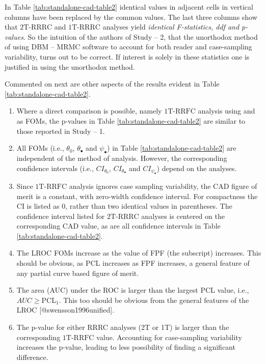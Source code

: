 \documentclass[
]{article}
\providecommand{\tightlist}{%
  \setlength{\itemsep}{0pt}\setlength{\parskip}{0pt}}
\begin{document}
In Table \ref{tab:standalone-cad-table2} identical values in adjacent cells in vertical columns have been replaced by the common values. The last three columns show that \(\text{2T-RRRC}\) and \(\text{1T-RRRC}\) analyses yield \emph{identical F-statistics, ddf and p-values}. So the intuition of the authors of Study -- 2, that the unorthodox method of using DBM -- MRMC software to account for both reader and case-sampling variability, turns out to be correct. If interest is solely in these statistics one is justified in using the unorthodox method.

Commented on next are other aspects of the results evident in Table \ref{tab:standalone-cad-table2}.

\begin{enumerate}
\def\labelenumi{\arabic{enumi}.}
\tightlist
\item
  Where a direct comparison is possible, namely \(\text{1T-RRFC}\) analysis using and as FOMs, the p-values in Table \ref{tab:standalone-cad-table2} are similar to those reported in Study -- 1.
\item
  All FOMs (i.e., \(\theta_0\), \(\theta_{\bullet}\) and \(\psi_{\bullet}\)) in Table \ref{tab:standalone-cad-table2} are independent of the method of analysis. However, the corresponding confidence intervals (i.e., \(CI_{\theta_0}\), \(CI_{\theta_{\bullet}}\) and \(CI_{\psi_{\bullet}}\)) depend on the analyses.
\item
  Since \(\text{1T-RRFC}\) analysis ignores case sampling variability, the CAD figure of merit is a constant, with zero-width confidence interval. For compactness the CI is listed as 0, rather than two identical values in parentheses. The confidence interval listed for \(\text{2T-RRRC}\) analyses is centered on the corresponding CAD value, as are all confidence intervals in Table \ref{tab:standalone-cad-table2}.
\item
  The LROC FOMs increase as the value of FPF (the subscript) increases.
  This should be obvious, as PCL increases as FPF increases, a general feature of any partial curve based figure of merit.
\item
  The area (AUC) under the ROC is larger than the largest PCL value, i.e., \(AUC \geq \text{PCL}_1\). This too should be obvious from the general features of the LROC {[}@swensson1996unified{]}.
\item
  The p-value for either RRRC analyses (2T or 1T) is larger than the corresponding \(\text{1T-RRFC}\) value. Accounting for case-sampling variability increases the p-value, leading to less possibility of finding a significant difference.

\end{enumerate}
\end{document}

